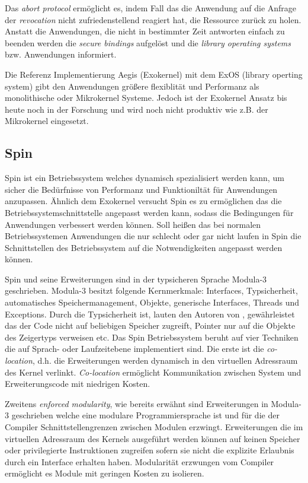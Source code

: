 \documentclass[11pt,technote]{IEEEtran}
\begin{document}
      Das \textit{abort protocol} erm\"oglicht es, indem Fall das die Anwendung auf die
      Anfrage der \textit{revocation} nicht zufriedenstellend reagiert hat, die Ressource zur\"uck zu holen.
      Anstatt die Anwendungen, die nicht in bestimmter Zeit antworten einfach zu beenden werden die
      \textit{secure bindings} aufgel\"ost und die \textit{library operating systems} bzw. Anwendungen informiert.
        
      Die Referenz Implementierung Aegis (Exokernel) mit dem ExOS (library operting system) gibt den Anwendungen gr\"o\ss ere flexiblit\"at 
      und Performanz als monolithische oder Mikrokernel Systeme. Jedoch ist der Exokernel Ansatz bis heute noch in der Forschung und wird
      noch nicht produktiv wie z.B. der Mikrokernel eingesetzt.
        
        
    \subsection{Spin} \label{sec:other:spin}
      Spin ist ein Betriebssystem welches dynamisch spezialisiert werden kann, um sicher die Bed\"urfnisse von Performanz und Funktionilt\"at f\"ur
      Anwendungen anzupassen. \"Ahnlich dem Exokernel versucht Spin es zu erm\"oglichen das die Betriebssystemschnittstelle angepasst werden kann,
      sodass die Bedingungen f\"ur Anwendungen verbessert werden k\"onnen. Soll hei\ss en das bei normalen Betriebssystemen Anwendungen die nur 
      schlecht oder gar nicht laufen in Spin die Schnittstellen des Betriebssystem auf die Notwendigkeiten angepasst werden k\"onnen.
      
      Spin und seine Erweiterungen sind in der typsicheren Sprache Modula-3 geschrieben. Modula-3 besitzt folgende Kernmerkmale: 
      Interfaces, Typsicherheit, automatisches Speichermanagement, Objekte, generische Interfaces, Threads und Exceptions.
      Durch die Typsicherheit ist, lauten den Autoren von \cite{inproc:spin}, gew\"ahrleistet das der Code nicht auf beliebigen Speicher zugreift,
      Pointer nur auf die Objekte des Zeigertyps verweisen etc.
      Das Spin Betriebssystem beruht auf vier Techniken die auf Sprach- oder Laufzeitebene implementiert sind.
      Die erste ist die \textit{co-location}, d.h. die Erweiterungen werden dynamisch in den virtuellen Adressraum des Kernel verlinkt.
      \textit{Co-location} erm\"oglicht Kommunikation zwischen System und Erweiterungscode mit niedrigen Kosten.
      
      Zweitens \textit{enforced modularity}, wie bereits erw\"ahnt sind Erweiterungen in Modula-3 geschrieben welche eine modulare
      Programmiersprache ist und f\"ur die der Compiler Schnittstellengrenzen zwischen Modulen erzwingt.
      Erweiterungen die im virtuellen Adressraum des Kernels ausgef\"uhrt werden k\"onnen auf keinen Speicher oder privilegierte Instruktionen 
      zugreifen sofern sie nicht die explizite Erlaubnis durch ein Interface erhalten haben.
      Modularit\"at erzwungen vom Compiler erm\"oglicht es Module mit geringen Kosten zu isolieren.
      
\end{document}
